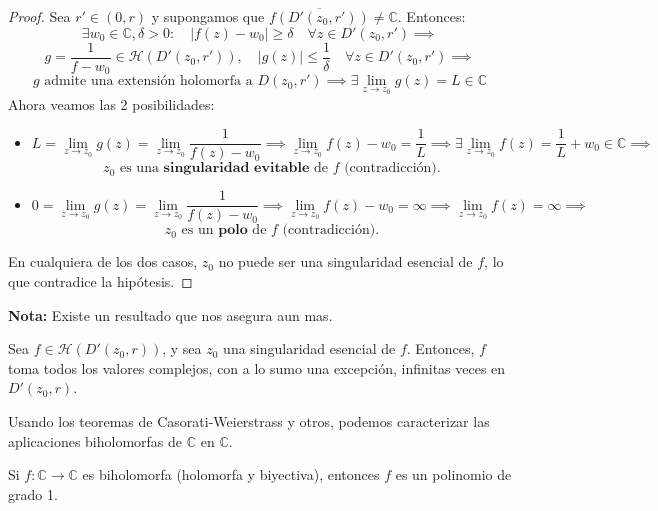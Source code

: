\begin{proof}
    Sea $r' \in (0, r)$ y supongamos que $\overline{f(D'(z_0, r'))} \neq \mathbb{C}$. Entonces:
    \[
    \exists w_0 \in \mathbb{C}, \delta > 0 : \quad \left| f(z) - w_0 \right| \geq \delta \quad \forall z \in D'(z_0, r') \implies
    \]
    \[
    g = \frac{1}{f - w_0} \in \mathcal{H}(D'(z_0, r')), \quad |g(z)| \leq \frac{1}{\delta} \quad \forall z \in D'(z_0, r') \implies
    \]
    \[
    g \text{ admite una extensión holomorfa a } D(z_0, r') \implies
    \exists \lim_{z \to z_0} g(z) = L \in \mathbb{C}
    \]
    Ahora veamos las 2 posibilidades:
    \begin{itemize}
        \item[$L \neq 0$:] 
        \[
        L =
        \lim_{z \to z_0} g(z) =
        \lim_{z \to z_0} \frac{1}{f(z) - w_0} \implies
        \lim_{z \to z_0} f(z) - w_0 = \frac{1}{L} \implies
        \exists \lim_{z \to z_0} f(z) = \frac{1}{L} + w_0 \in \mathbb{C} \implies
        \]
        \[
        z_0 \text{ es una } \textbf{singularidad evitable} \text{ de } f \text{ (contradicción).}
        \]
        \item[$L = 0$:]
        \[
        0 = \lim_{z \to z_0} g(z) =
        \lim_{z \to z_0} \frac{1}{f(z) - w_0} \implies
        \lim_{z \to z_0} f(z) - w_0 = \infty \implies
        \lim_{z \to z_0} f(z) = \infty \implies
        \]
        \[
        z_0 \text{ es un } \textbf{polo} \text{ de } f \text{ (contradicción).}
        \]
    \end{itemize}
    En cualquiera de los dos casos, $z_0$ no puede ser una singularidad esencial de $f$, lo que contradice la hipótesis.
\end{proof}

\textbf{Nota: } Existe un resultado que nos asegura aun mas.

\begin{teorema}
    Sea $f \in \mathcal{H}(D'(z_0, r))$, y sea $z_0$ una singularidad esencial de $f$. Entonces, $f$ toma todos los valores complejos, con a lo sumo una excepción, infinitas veces en $D'(z_0, r)$.
\end{teorema}

Usando los teoremas de Casorati-Weierstrass y otros, podemos caracterizar las aplicaciones biholomorfas de $\mathbb{C}$ en $\mathbb{C}$.

\begin{proposición}
    Si $f : \mathbb{C} \to \mathbb{C}$ es biholomorfa (holomorfa y biyectiva), entonces $f$ es un polinomio de grado 1.
\end{proposición}

